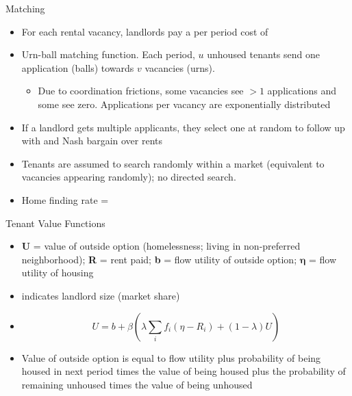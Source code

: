 \documentclass[10pt, xcolor=dvipsnames]{beamer}
\begin{document}
\begin{frame}{Matching}
    \begin{itemize}
    \item For each rental vacancy, landlords pay a per period cost of 
    \item Urn-ball matching function. Each period, \textbf{$u$} unhoused tenants send one application (balls) towards \textbf{$v$} vacancies (urns).
    \begin{itemize}
        \item Due to coordination frictions, some vacancies see $>1$ applications and some see zero. Applications per vacancy are exponentially distributed
    \end{itemize}
    \item If a landlord gets multiple applicants, they select one at random to follow up with and Nash bargain over rents
        
    \item Tenants are assumed to search randomly within a market (equivalent to vacancies appearing randomly); no directed search.
    \item Home finding rate = 
\end{itemize}
\end{frame}

\begin{frame}{Tenant Value Functions}
\begin{itemize}
    \item \textbf{U} = value of outside option (homelessness; living in non-preferred neighborhood); \textbf{R} = rent paid; \textbf{b} = flow utility of outside option; $\boldsymbol{\eta}$ = flow utility of housing
    \item {} indicates landlord size (market share)
    \item \begin{equation}
        U = b + \beta\left(\lambda \sum_{i} f_i(\eta - R_i) + (1-\lambda)U\right)\label{eq:tenant-val}
    \end{equation}
    \item Value of outside option is equal to flow utility plus probability of being housed in next period times the value of being housed plus the probability of remaining unhoused times the value of being unhoused
\end{itemize}
\end{frame}
\end{document}
